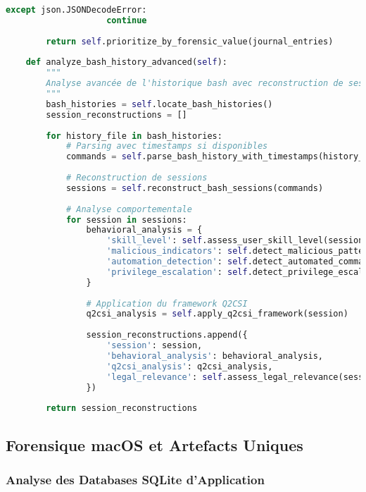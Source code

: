 \begin{lstlisting}[language=Python, caption=Analyseur de logs Linux avec détection d'anomalies]
                except json.JSONDecodeError:
                    continue
                    
        return self.prioritize_by_forensic_value(journal_entries)
    
    def analyze_bash_history_advanced(self):
        """
        Analyse avancée de l'historique bash avec reconstruction de sessions
        """
        bash_histories = self.locate_bash_histories()
        session_reconstructions = []
        
        for history_file in bash_histories:
            # Parsing avec timestamps si disponibles
            commands = self.parse_bash_history_with_timestamps(history_file)
            
            # Reconstruction de sessions
            sessions = self.reconstruct_bash_sessions(commands)
            
            # Analyse comportementale
            for session in sessions:
                behavioral_analysis = {
                    'skill_level': self.assess_user_skill_level(session),
                    'malicious_indicators': self.detect_malicious_patterns(session),
                    'automation_detection': self.detect_automated_commands(session),
                    'privilege_escalation': self.detect_privilege_escalation(session)
                }
                
                # Application du framework Q2CSI
                q2csi_analysis = self.apply_q2csi_framework(session)
                
                session_reconstructions.append({
                    'session': session,
                    'behavioral_analysis': behavioral_analysis,
                    'q2csi_analysis': q2csi_analysis,
                    'legal_relevance': self.assess_legal_relevance(session)
                })
                
        return session_reconstructions
\end{lstlisting}

\subsection{Forensique macOS et Artefacts Uniques}

\subsubsection{Analyse des Databases SQLite d'Application}

